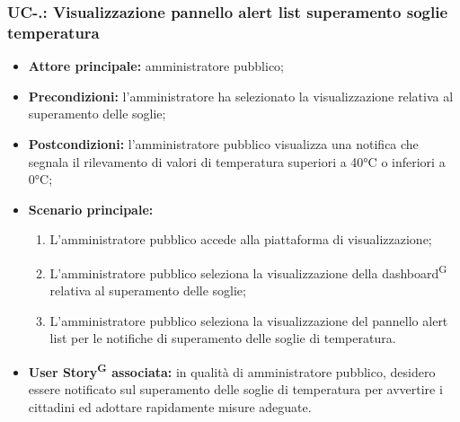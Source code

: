 \documentclass[8pt]{article}
\newcommand{\glossterm}[1]{#1\textsuperscript{G}} %
\begin{document}
\subsubsection*{UC-\theuc .\speconenumber: Visualizzazione pannello alert list superamento soglie temperatura}
\begin{itemize}
    \item \textbf{Attore principale:} amministratore pubblico;
    \item \textbf{Precondizioni:} l'amministratore ha selezionato la visualizzazione relativa al superamento delle soglie;
    \item \textbf{Postcondizioni:} l’amministratore pubblico visualizza una notifica che segnala il rilevamento di valori di temperatura superiori a 40°C o inferiori a 0°C;
    \item \textbf{Scenario principale:}
        \begin{enumerate}
        \item L’amministratore pubblico accede alla piattaforma di visualizzazione;
        \item L’amministratore pubblico seleziona la visualizzazione della \glossterm{dashboard} relativa al superamento delle soglie;
        \item L'amministratore pubblico seleziona la visualizzazione del pannello alert list per le notifiche di superamento delle soglie di temperatura.
        \end{enumerate}
    \item \textbf{\glossterm{User Story} associata:} in qualità di amministratore pubblico, desidero essere notificato sul superamento delle soglie di temperatura per avvertire i cittadini ed adottare rapidamente misure adeguate.
\end{itemize}
\end{document}
